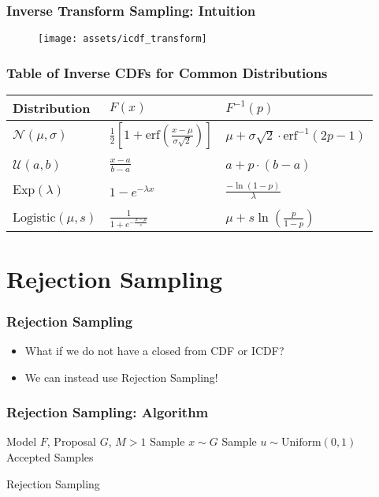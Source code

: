 \documentclass{beamer}
\begin{document}
\begin{frame}
  \frametitle{Inverse Transform Sampling: Intuition}
  \begin{figure}
    \centering
    \texttt{[image: assets/icdf\_transform]}
  \end{figure}
\end{frame}


\begin{frame}
\frametitle{Table of Inverse CDFs for Common Distributions}
\begin{center}
\begin{tabular}{L{2cm}C{3.2cm}C{4.2cm}}
\toprule
{Distribution} & $F(x)$ & $F^{-1}(p)$ \\
\midrule
$\mathcal{N}(\mu, \sigma)$   & $\frac{1}{2} \left[ 1 + \text{erf} \left( \frac{x - \mu}{\sigma \sqrt{2}} \right) \right]$ & $\mu + \sigma \sqrt{2} \cdot \text{erf}^{-1}\left( 2p - 1 \right)$ \\
\\
$\mathcal{U}(a, b)$       & $\frac{x - a}{b - a}$ & $a + p \cdot \left( b - a \right)$ \\
\\
$\text{Exp}(\lambda)$        & $1 - e^{-\lambda x}$  & $\frac{- \ln \left( 1 - p \right)}{\lambda}$ \\
\\
$\text{Logistic}(\mu, s)$    & $\frac{1}{1+e^{-\frac{x-\mu}{s}}}$ & $\mu + s \ln \left( \frac{p}{1-p} \right)$\\
\bottomrule
\end{tabular}
\end{center}
\end{frame}



\section{Rejection Sampling}
\begin{frame}
  \frametitle{Rejection Sampling}
  \begin{itemize}
    \item What if we do not have a closed from CDF or ICDF?
    \item We can instead use Rejection Sampling!
  \end{itemize}
\end{frame}


\begin{frame}
\frametitle{Rejection Sampling: Algorithm}
\begin{algorithm}[H]
\begin{algorithmic}[1]
  \REQUIRE Model $F$, Proposal $G$, $M > 1$
  \STATE Sample $x \sim G$
  \STATE Sample $u \sim \text{Uniform}(0, 1)$
  \ELSE
  \ENDIF
  \ENSURE Accepted Samples
\end{algorithmic}
\caption{Rejection Sampling}
\end{algorithm}
\end{frame}
\end{document}
